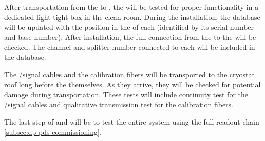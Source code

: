 After  transportation from the  to \surf, the  will be tested for proper functionality in a dedicated light-tight box in the clean room. During the installation, the  database will be updated with the position in the  of each  (identified by its serial number and base number). After installation, the full connection from the  to the  will be checked. The  channel and splitter number connected to each  will be included in the  database.

The /signal cables and the calibration fibers will be transported to the cryostat roof long before the  themselves. As they arrive, they will be checked for potential damage during transportation. These tests will include continuity test for the /signal cables and qualitative transmission test for the calibration fibers.

The last step of  and  will be to test the entire system using the full readout chain \ref{subsec:dp-pds-commissioning}.
